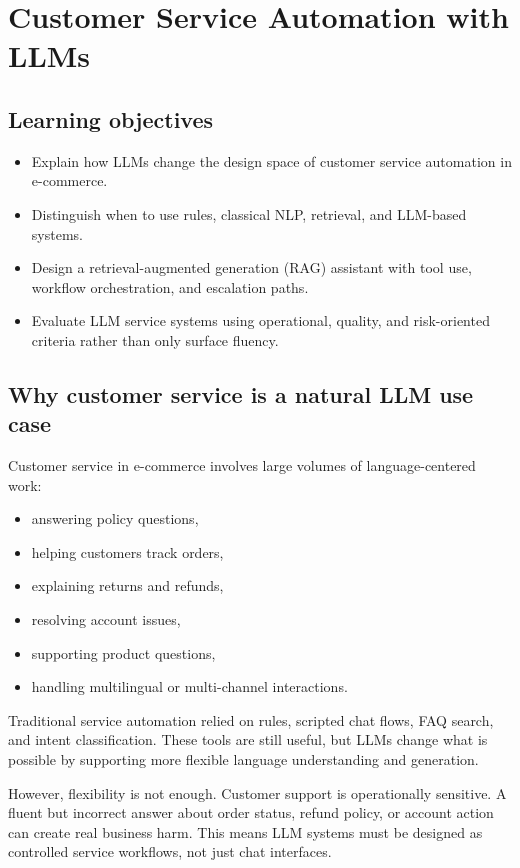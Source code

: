 \chapter{Customer Service Automation with LLMs}

\section{Learning objectives}
\begin{itemize}
  \item Explain how LLMs change the design space of customer service automation in e-commerce.
  \item Distinguish when to use rules, classical NLP, retrieval, and LLM-based systems.
  \item Design a retrieval-augmented generation (RAG) assistant with tool use, workflow orchestration, and escalation paths.
  \item Evaluate LLM service systems using operational, quality, and risk-oriented criteria rather than only surface fluency.
\end{itemize}

\section{Why customer service is a natural LLM use case}
Customer service in e-commerce involves large volumes of language-centered work:
\begin{itemize}
  \item answering policy questions,
  \item helping customers track orders,
  \item explaining returns and refunds,
  \item resolving account issues,
  \item supporting product questions,
  \item handling multilingual or multi-channel interactions.
\end{itemize}

Traditional service automation relied on rules, scripted chat flows, FAQ search, and intent classification.
These tools are still useful, but LLMs change what is possible by supporting more flexible language understanding and generation.

However, flexibility is not enough.
Customer support is operationally sensitive.
A fluent but incorrect answer about order status, refund policy, or account action can create real business harm.
This means LLM systems must be designed as controlled service workflows, not just chat interfaces.

